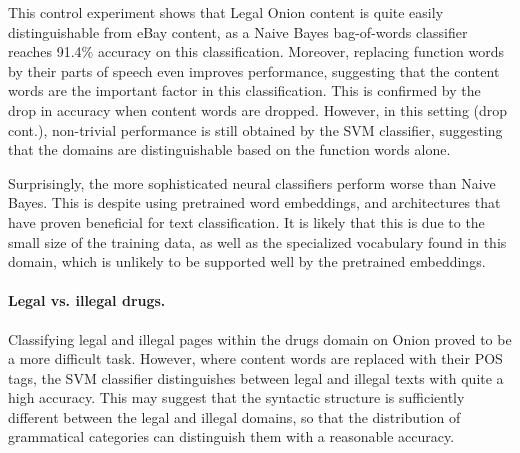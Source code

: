 \documentclass[11pt,a4paper,table]{article}
\begin{document}
This control experiment shows that Legal Onion content is quite easily
distinguishable from eBay content, as a Naive Bayes bag-of-words classifier
reaches 91.4\% accuracy on this classification.
Moreover, replacing function words by their parts of speech even improves
performance, suggesting that the content words are the important factor in this classification.
This is confirmed by the drop in accuracy when content words are dropped.
However, in this setting (drop cont.), non-trivial performance is still
obtained by the SVM classifier, suggesting that the domains are distinguishable
based on the function words alone.

Surprisingly, the more sophisticated neural classifiers perform worse than Naive Bayes.
This is despite using pretrained word embeddings,
and architectures that have proven beneficial for text classification.
It is likely that this is due to the small size of the training data, as well as the specialized
vocabulary found in this domain, which is unlikely to be supported well by the pretrained embeddings.


\paragraph{Legal vs. illegal drugs.}

Classifying legal and illegal pages within the drugs domain on Onion
proved to be a more difficult task.
However, where content words are replaced with their POS tags,
the SVM classifier distinguishes between legal and illegal texts with quite a high accuracy.
This may suggest that the syntactic structure is sufficiently different between the legal and illegal
domains, so that the distribution of grammatical categories can distinguish them with a reasonable accuracy.
%
\end{document}
